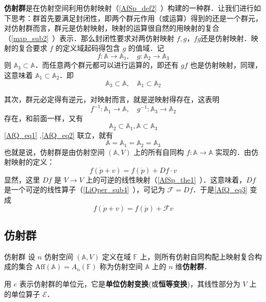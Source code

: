 
\begin{issues}
\issueDraft
\end{issues}

\textbf{仿射群}是在仿射空间利用仿射映射（\autoref{AfSp_def2}~）构建的一种群．让我们进行如下思考：群首先要满足封闭性，即两个群元作用（或运算）得到的还是一个群元，对仿射群而言，群元是仿射映射，映射的运算很自然的用映射的复合（\autoref{map_sub2}~）表示．那么封闭性要求对两仿射映射 $f,g$，$fg$还是仿射映射．映射的复合要求 $f$ 的定义域起码得包含 $g$ 的值域．记
 \begin{equation}
f:\mathbb A\rightarrow\mathbb A_1,\quad g:\mathbb A_2\rightarrow \mathbb A_3
 \end{equation}
 则 $\mathbb A_3\subset \mathbb A$．而任意两个群元都可以进行运算的，即还有 $gf$ 也是仿射映射，同理，这意味着 $\mathbb A_1\subset\mathbb A_2$．即
 \begin{equation}\label{AfQ_eq1}
 \mathbb A_3\subset \mathbb A,\quad \mathbb A_1\subset\mathbb A_2
 \end{equation}
 
 其次，群元必定得有逆元，对映射而言，就是逆映射得存在，这表明
\begin{equation}
 f^{-1}:\mathbb A_1\rightarrow\mathbb A,\quad g^{-1}:\mathbb A_3\rightarrow\mathbb A_2
\end{equation}
 存在，和前面一样，又有
 \begin{equation}\label{AfQ_eq2}
 \mathbb A_2\subset \mathbb A_1, \mathbb A\subset\mathbb A_3
 \end{equation}
 \autoref{AfQ_eq1} ,\autoref{AfQ_eq2} 联立，就有
 \begin{equation}
 \mathbb A=\mathbb A_1= \mathbb A_2=\mathbb A_3
 \end{equation}
 也就是说，仿射群是由仿射空间 $(\mathbb A,V)$ 上的所有自同构 $f:\mathbb A\rightarrow\mathbb A$ 实现的．由仿射映射的定义：
 \begin{equation}\label{AfQ_eq3}
 f(\dot p+v)=f(\dot p)+Df\cdot v
 \end{equation}
 显然，这里 $Df$ 是 $V\rightarrow V$ 上的可逆的线性映射（\autoref{AfSp_the1}~）．这意味着，$Df$ 是一个可逆的线性算子（\autoref{LiOper_sub4}~），可记为 $\mathcal F=Df$．于是\autoref{AfQ_eq3} 变成
 \begin{equation}
 f(\dot p+v)=f(\dot p)+\mathcal F v
 \end{equation}
 \subsection{仿射群}
 \begin{definition}{仿射群}
 设 $n$ 仿射空间 $(\mathbb A,V)$ 定义在域 $\mathbb F$ 上，则所有仿射自同构配上映射复合构成的集合 $\mathrm{Aff}(\mathbb A)=A_n(\mathbb F)$ 称为仿射空间 $\mathbb A$ 上的 $n$ 维\textbf{仿射群}．
 \end{definition}
 用 $e$ 表示仿射群的单位元，它是\textbf{单位仿射变换}(或\textbf{恒等变换})，其线性部分为 $V$ 上的单位算子 $\mathcal E$．

